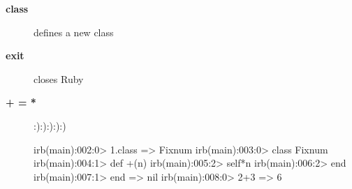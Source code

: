 \documentclass[10pt,a4paper]{scrartcl}
\begin{document}
\begin{description}
\item[\bf{class}] defines a new class
    \begin{terminalcode}
    \end{terminalcode}
\item[\bf{exit}] closes Ruby
    \begin{terminalcode}
    \end{terminalcode}

\item[\bf{+ = *}] :):):):):)
    \begin{terminalcode}
irb(main):002:0> 1.class
=> Fixnum
irb(main):003:0> class Fixnum
irb(main):004:1> def +(n)
irb(main):005:2> self*n
irb(main):006:2> end
irb(main):007:1> end
=> nil
irb(main):008:0> 2+3
=> 6
    \end{terminalcode}

\end{description} 
\end{document}
